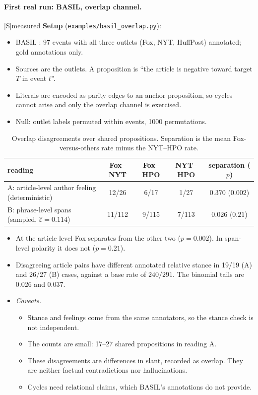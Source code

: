 \documentclass[11pt]{article}
\theoremstyle{definition}
\theoremstyle{remark}
\newcommand{\src}[1]{\textsf{\small[#1]}}
\newcommand{\st}[1]{\textsf{\small\color{gray}#1}}
\begin{document}
\paragraph{First real run: BASIL, overlap channel.}\src{S}\st{measured}
\textbf{Setup} (\texttt{examples/basil\_overlap.py}):
\begin{itemize}
  \item BASIL \cite{basil}: 97 events with all three outlets (Fox, NYT, HuffPost) annotated; gold annotations only.
  \item Sources are the outlets. A proposition is ``the article is negative toward target $T$ in event $t$''.
  \item Literals are encoded as parity edges to an anchor proposition, so cycles cannot arise and only the overlap channel is exercised.
  \item Null: outlet labels permuted within events, 1000 permutations.
\end{itemize}
\begin{table}[!htbp]\centering\small
\begin{tabular}{lcccc}
\toprule
reading & Fox--NYT & Fox--HPO & NYT--HPO & separation ($p$)\\
\midrule
A: article-level author feeling (deterministic) & 12/26 & 6/17 & 1/27 & $0.370$ ($0.002$)\\
B: phrase-level spans (sampled, $\hat\varepsilon=0.114$) & 11/112 & 9/115 & 7/113 & $0.026$ ($0.21$)\\
\bottomrule
\end{tabular}
\caption{Overlap disagreements over shared propositions. Separation is the mean Fox-versus-others rate minus the NYT--HPO rate.}
\end{table}
\begin{itemize}
  \item At the article level Fox separates from the other two ($p=0.002$). In span-level polarity it does not ($p=0.21$).
  \item Disagreeing article pairs have different annotated relative stance in 19/19 (A) and 26/27 (B) cases, against a base rate of $240/291$. The binomial tails are $0.026$ and $0.037$.
  \item \emph{Caveats.}
  \begin{itemize}
    \item Stance and feelings come from the same annotators, so the stance check is not independent.
    \item The counts are small: 17--27 shared propositions in reading A.
    \item These disagreements are differences in slant, recorded as overlap. They are neither factual contradictions nor hallucinations.
    \item Cycles need relational claims, which BASIL's annotations do not provide.
  \end{itemize}
\end{itemize}
\end{document}
